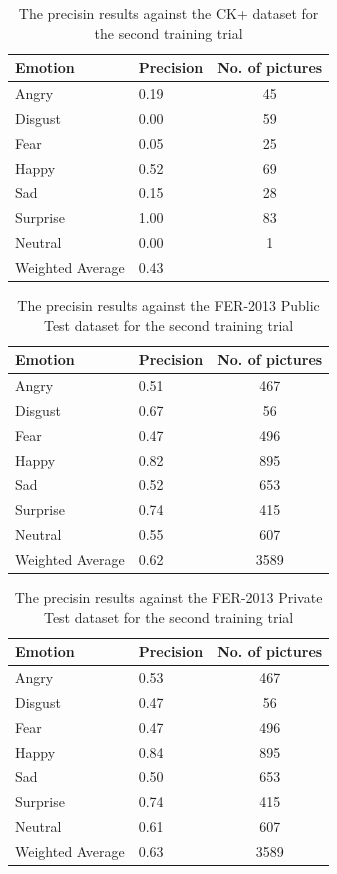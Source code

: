 \documentclass[runningheads,a4paper,11pt]{report}
\begin{document}
\begin{table}[htbp]
	\caption{The precisin results against the CK+ dataset for the second training trial}
	\label{fer_training_28k_01_ckp}
		\begin{center}
			\begin{tabular}{p{110pt}p{110pt}c}
				\textbf{Emotion}& \textbf{Precision}& \textbf{No. of pictures} \\
				\hline\hline
				Angry& 0.19& 45 \\
				Disgust& 0.00& 59 \\
				Fear& 0.05& 25 \\
				Happy& 0.52& 69 \\
				Sad& 0.15& 28 \\
				Surprise& 1.00& 83 \\
				Neutral& 0.00& 1 \\
				\hline
				Weighted Average& 0.43
			\end{tabular}
		\end{center}
\end{table}
\begin{table}[htbp]
	\caption{The precisin results against the FER-2013 Public Test dataset for the second training trial}
	\label{fer_training_28k_01_public_test}
		\begin{center}
			\begin{tabular}{p{110pt}p{110pt}c}
				\textbf{Emotion}& \textbf{Precision}& \textbf{No. of pictures} \\
				\hline\hline
				Angry& 0.51& 467 \\
				Disgust& 0.67& 56 \\
				Fear& 0.47& 496 \\
				Happy& 0.82& 895 \\
				Sad& 0.52& 653 \\
				Surprise& 0.74& 415 \\
				Neutral& 0.55& 607 \\
				\hline
				Weighted Average& 0.62 &3589
			\end{tabular}
		\end{center}
\end{table}
\begin{table}[htbp]
	\caption{The precisin results against the FER-2013 Private Test dataset for the second training trial}
	\label{fer_training_28k_01_private_test}
		\begin{center}
			\begin{tabular}{p{110pt}p{110pt}c}
				\textbf{Emotion}& \textbf{Precision}& \textbf{No. of pictures} \\
				\hline\hline
				Angry& 0.53& 467 \\
				Disgust& 0.47& 56 \\
				Fear& 0.47& 496 \\
				Happy& 0.84& 895 \\
				Sad& 0.50& 653 \\
				Surprise& 0.74& 415 \\
				Neutral& 0.61& 607 \\
				\hline
				Weighted Average& 0.63 &3589
			\end{tabular}
		\end{center}
\end{table}
\pagebreak
\end{document}
